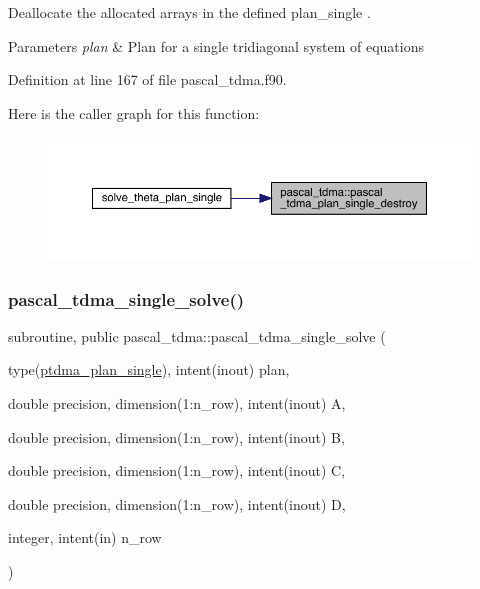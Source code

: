 Deallocate the allocated arrays in the defined plan\+\_\+single . 


\begin{DoxyParams}{Parameters}
{\em plan} & Plan for a single tridiagonal system of equations \\
\hline
\end{DoxyParams}


Definition at line 167 of file pascal\+\_\+tdma.\+f90.

Here is the caller graph for this function\+:
\nopagebreak
\begin{figure}[H]
\begin{center}
\leavevmode
\includegraphics[width=350pt]{namespacepascal__tdma_adb04e59c740ce6c4b9518dd86eaeb594_icgraph}
\end{center}
\end{figure}
\mbox{\label{namespacepascal__tdma_ab14e132231d4b53fd65dd333ccc85a50}} 
\subsubsection{\texorpdfstring{pascal\_tdma\_single\_solve()}{pascal\_tdma\_single\_solve()}}
{\footnotesize\ttfamily subroutine, public pascal\+\_\+tdma\+::pascal\+\_\+tdma\+\_\+single\+\_\+solve (\begin{DoxyParamCaption}\item[{type(\mbox{\hyperlink{structpascal__tdma_1_1ptdma__plan__single}{ptdma\+\_\+plan\+\_\+single}}), intent(inout)}]{plan,  }\item[{double precision, dimension(1\+:n\+\_\+row), intent(inout)}]{A,  }\item[{double precision, dimension(1\+:n\+\_\+row), intent(inout)}]{B,  }\item[{double precision, dimension(1\+:n\+\_\+row), intent(inout)}]{C,  }\item[{double precision, dimension(1\+:n\+\_\+row), intent(inout)}]{D,  }\item[{integer, intent(in)}]{n\+\_\+row }\end{DoxyParamCaption})}



